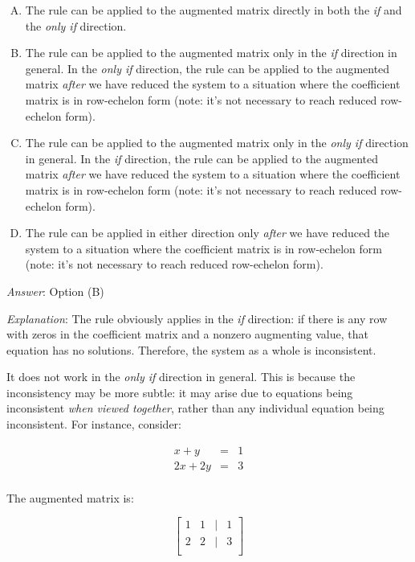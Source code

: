 \documentclass[10pt]{amsart}
\begin{document}
\begin{enumerate}
  \begin{enumerate}[(A)]
  \item The rule can be applied to the augmented matrix directly in
    both the {\em if} and the {\em only if} direction.
  \item The rule can be applied to the augmented matrix only in the
    {\em if} direction in general. In the {\em only if} direction, the
    rule can be applied to the augmented matrix {\em after} we have
    reduced the system to a situation where the coefficient matrix is
    in row-echelon form (note: it's not necessary to reach reduced
    row-echelon form).
  \item The rule can be applied to the augmented matrix only in the
    {\em only if} direction in general. In the {\em if} direction, the
    rule can be applied to the augmented matrix {\em after} we have
    reduced the system to a situation where the coefficient matrix is
    in row-echelon form (note: it's not necessary to reach reduced
    row-echelon form).
  \item The rule can be applied in either direction only {\em after}
    we have reduced the system to a situation where the coefficient
    matrix is in row-echelon form (note: it's not necessary to reach
    reduced row-echelon form).
  \end{enumerate}

  {\em Answer}: Option (B)

  {\em Explanation}: The rule obviously applies in the {\em if}
  direction: if there is any row with zeros in the coefficient matrix
  and a nonzero augmenting value, that equation has no
  solutions. Therefore, the system as a whole is inconsistent.

  It does not work in the {\em only if} direction in general. This is
  because the inconsistency may be more subtle: it may arise due to
  equations being inconsistent {\em when viewed together}, rather than
  any individual equation being inconsistent. For instance, consider:

  \begin{eqnarray*}
    x + y & = & 1 \\
    2x + 2y & = & 3 \\
  \end{eqnarray*}

  The augmented matrix is:

  $$\left[\begin{matrix} 1 & 1 & \mid & 1 \\ 2 & 2 & \mid & 3 \\\end{matrix}\right]$$


\end{enumerate}
\end{document}
